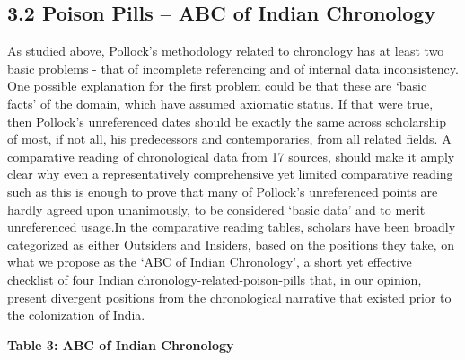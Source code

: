 \subsection*{3.2 Poison Pills – ABC of Indian Chronology}

As studied above, Pollock’s methodology related to chronology has at least two basic problems - that of incomplete referencing and of internal data inconsistency. One possible explanation for the first problem could be that these are ‘basic facts’ of the domain, which have assumed axiomatic status. If that were true, then Pollock’s unreferenced dates should be exactly the same across scholarship of most, if not all, his predecessors and contemporaries, from all related fields. A comparative reading of chronological data from 17 sources, should make it amply clear why even a representatively comprehensive yet limited comparative reading such as this is enough to prove that many of Pollock’s unreferenced points are hardly agreed upon unanimously, to be considered ‘basic data’ and to merit unreferenced usage.In the comparative reading tables, scholars have been broadly categorized as either Outsiders and Insiders, based on the positions they take, on what we propose as the ‘ABC of Indian Chronology’, a short yet effective checklist of four Indian chronology-related-poison-pills that, in our opinion, present divergent positions from the chronological narrative that existed prior to the colonization of India.

\newpage

\textbf{Table 3: ABC of Indian Chronology}

